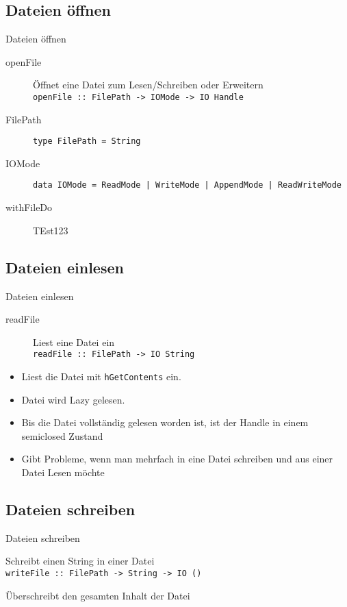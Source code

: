 \documentclass{beamer}
\begin{document}
\subsection{Dateien \"offnen}
\begin{frame}[<+->]{Dateien \"offnen}
\begin{description}
\item[openFile] Öffnet eine Datei zum Lesen/Schreiben oder Erweitern \\ \texttt{\small openFile :: FilePath -> IOMode -> IO Handle}
\item[FilePath] \texttt{type FilePath = String}
\item[IOMode] \texttt{data IOMode = ReadMode | WriteMode | AppendMode | ReadWriteMode}
\item[withFileDo]TEst123
\end{description}
\end{frame}

\subsection{Dateien einlesen}
\begin{frame}{Dateien einlesen}
\begin{description}
\item[readFile] Liest eine Datei ein \\ \texttt{readFile :: FilePath -> IO String}
\end{description}
\begin{itemize}
\item Liest die Datei mit \texttt{hGetContents} ein.
\item Datei wird Lazy gelesen.
\item Bis die Datei vollständig gelesen worden ist, ist der Handle in einem semiclosed Zustand
\item Gibt Probleme, wenn man mehrfach in eine Datei schreiben und aus einer Datei Lesen möchte
\end{itemize}
\end{frame}

\subsection{Dateien schreiben}
\begin{frame}{Dateien schreiben}
\begin{description}
\item[writeFile] Schreibt einen String in einer Datei \\ \texttt{writeFile :: FilePath -> String -> IO ()}
\item Überschreibt den gesamten Inhalt der Datei
\end{description}
\end{frame}
\end{document}
